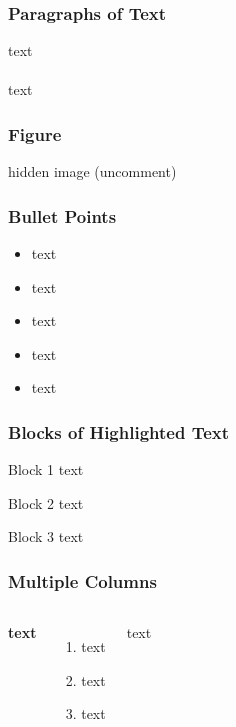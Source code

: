 \documentclass{beamer}
\begin{document}
\begin{frame}
\frametitle{Paragraphs of Text}
text\\~\\

text
\end{frame}


\begin{frame}
\frametitle{Figure}
hidden image (uncomment)
\end{frame}


\begin{frame}
\frametitle{Bullet Points}
\begin{itemize}
\item text
\item text
\item text
\item text
\item text
\end{itemize}
\end{frame}


\begin{frame}
\frametitle{Blocks of Highlighted Text}
\begin{block}{Block 1}
text
\end{block}

\begin{block}{Block 2}
text
\end{block}

\begin{block}{Block 3}
text
\end{block}
\end{frame}


\begin{frame}
\frametitle{Multiple Columns}
\begin{columns}[c] %

\textbf{text}
\begin{enumerate}
\item text
\item text
\item text
\end{enumerate}

text

\end{columns}
\end{frame}
\end{document}
